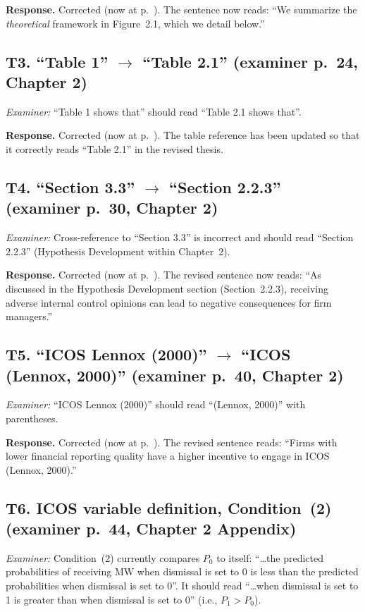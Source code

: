 \documentclass[11pt,a4paper]{article}
\newcommand{\nowat}[1]{(now at p.~\pageref{#1})}
\begin{document}
\noindent\textbf{Response.} Corrected \nowat{viva:c2-theoretical}. The sentence now reads: ``We summarize the \emph{theoretical} framework in Figure~2.1, which we detail below.''

\subsection*{T3. ``Table 1'' $\rightarrow$ ``Table 2.1'' (examiner p.~24, Chapter 2)}
\textit{Examiner:} ``Table 1 shows that'' should read ``Table 2.1 shows that''.

\noindent\textbf{Response.} Corrected \nowat{viva:c2-table21}. The table reference has been updated so that it correctly reads ``Table 2.1'' in the revised thesis.

\subsection*{T4. ``Section 3.3'' $\rightarrow$ ``Section 2.2.3'' (examiner p.~30, Chapter 2)}
\textit{Examiner:} Cross-reference to ``Section 3.3'' is incorrect and should read ``Section 2.2.3'' (Hypothesis Development within Chapter~2).

\noindent\textbf{Response.} Corrected \nowat{viva:c2-section223}. The revised sentence now reads: ``As discussed in the Hypothesis Development section (Section~2.2.3), receiving adverse internal control opinions can lead to negative consequences for firm managers.''

\subsection*{T5. ``ICOS Lennox (2000)'' $\rightarrow$ ``ICOS (Lennox, 2000)'' (examiner p.~40, Chapter 2)}
\textit{Examiner:} ``ICOS Lennox (2000)'' should read ``(Lennox, 2000)'' with parentheses.

\noindent\textbf{Response.} Corrected \nowat{viva:c2-citep}. The revised sentence reads: ``Firms with lower financial reporting quality have a higher incentive to engage in ICOS (Lennox, 2000).''

\subsection*{T6. ICOS variable definition, Condition~(2) (examiner p.~44, Chapter 2 Appendix)}
\textit{Examiner:} Condition~(2) currently compares $P_0$ to itself: ``\ldots the predicted probabilities of receiving MW when dismissal is set to 0 is less than the predicted probabilities when dismissal is set to 0''. It should read ``\ldots when dismissal is set to 1 is greater than when dismissal is set to 0'' (i.e., $P_1 > P_0$).
\end{document}
